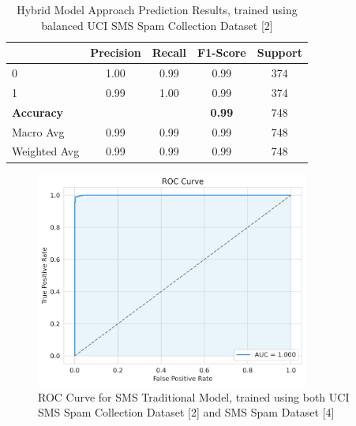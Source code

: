 \documentclass{article}
\begin{document}
\begin{table}[htbp]
    \centering
    \caption{Hybrid Model Approach Prediction Results, trained using balanced UCI SMS Spam Collection Dataset [2]}
    \begin{tabular}{l c c c c}
    \toprule
     & Precision & Recall & F1-Score & Support \\
    \midrule
    0 & 1.00 & 0.99 & 0.99 & 374 \\
    1 & 0.99 & 1.00 & 0.99 & 374 \\
    \midrule
    \textbf{Accuracy} & & & \textbf{0.99} & 748 \\
    Macro Avg & 0.99 & 0.99 & 0.99 & 748 \\
    Weighted Avg & 0.99 & 0.99 & 0.99 & 748 \\
    \bottomrule
    \end{tabular}
    \label{tab:classification_report_5}
\end{table}


\begin{figure}[htbp]
    \centering
    \includegraphics[width=0.8\textwidth]{../analysis/sms/traditional/roc_curve.png}
    \caption{ROC Curve for SMS Traditional Model, trained using both UCI SMS Spam Collection Dataset [2] and SMS Spam Dataset [4]}
    \label{fig:roc_curve_6}
\end{figure}
\end{document}
